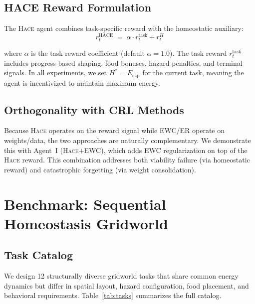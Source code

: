 \documentclass{article}
\newcommand{\setpoint}{H^*}
\newcommand{\energy}{E}
\newcommand{\reward}{r}
\newcommand{\hace}{\textsc{Hace}}
\begin{document}
\subsection{HACE Reward Formulation}

The \hace{} agent combines task-specific reward with the homeostatic
auxiliary:
\begin{equation}
  \reward_t^{\text{HACE}} \;=\;
    \alpha \cdot \reward_t^{\text{task}} + \reward_t^H
  \label{eq:hace}
\end{equation}

where $\alpha$ is the task reward coefficient (default $\alpha = 1.0$).
The task reward $\reward_t^{\text{task}}$ includes progress-based shaping,
food bonuses, hazard penalties, and terminal signals. In all experiments,
we set $\setpoint = \energy_{\text{cap}}$ for the current task, meaning
the agent is incentivized to maintain maximum energy.

\subsection{Orthogonality with CRL Methods}

Because \hace{} operates on the reward signal while EWC/ER operate on
weights/data, the two approaches are naturally complementary. We
demonstrate this with Agent~I (\hace{}+EWC), which adds EWC
regularization on top of the \hace{} reward. This combination addresses
both viability failure (via homeostatic reward) and catastrophic
forgetting (via weight consolidation).

\section{Benchmark: Sequential Homeostasis Gridworld}
\label{sec:benchmark}

\subsection{Task Catalog}

We design 12 structurally diverse gridworld tasks that share common
energy dynamics but differ in spatial layout, hazard configuration,
food placement, and behavioral requirements. Table~\ref{tab:tasks}
summarizes the full catalog.
\end{document}
